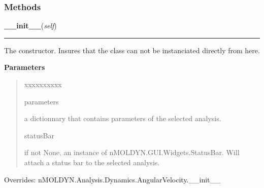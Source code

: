 
  \subsubsection{Methods}

    \vspace{0.5ex}

\hspace{.8\funcindent}\begin{boxedminipage}{\funcwidth}

    \raggedright \textbf{\_\_init\_\_}(\textit{self})

    \vspace{-1.5ex}

    \rule{\textwidth}{0.5\fboxrule}
\setlength{\parskip}{2ex}
    The constructor. Insures that the class can not be instanciated 
    directly from here.

\setlength{\parskip}{1ex}
      \textbf{Parameters}
      \vspace{-1ex}

      \begin{quote}
        \begin{Ventry}{xxxxxxxxxx}

          \item[parameters]

          a dictionnary that contains parameters of the selected analysis.

          \item[statusBar]

          if not None, an instance of nMOLDYN.GUI.Widgets.StatusBar. Will 
          attach a status bar to the selected analysis.

        \end{Ventry}

      \end{quote}

      Overrides: nMOLDYN.Analysis.Dynamics.AngularVelocity.\_\_init\_\_

    \end{boxedminipage}

    \label{nMOLDYN:Analysis:Dynamics:AngularDensityOfStates:initialize}

